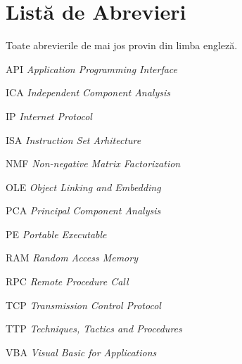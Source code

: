 \chapter*{Listă de Abrevieri}

\thispagestyle{front}

\noindent Toate abrevierile de mai jos provin din limba engleză.

\vspace{0.3cm}

\begin{abbreviations}
    \item[API] \textit{Application Programming Interface}
    \item[ICA] \textit{Independent Component Analysis}
    \item[IP] \textit{Internet Protocol}
    \item[ISA] \textit{Instruction Set Arhitecture}
    \item[NMF] \textit{Non-negative Matrix Factorization}
    \item[OLE] \textit{Object Linking and Embedding}
    \item[PCA] \textit{Principal Component Analysis}
    \item[PE] \textit{Portable Executable}
    \item[RAM] \textit{Random Access Memory}
    \item[RPC] \textit{Remote Procedure Call}
    \item[TCP] \textit{Transmission Control Protocol}
    \item[TTP] \textit{Techniques, Tactics and Procedures}
    \item[VBA] \textit{Visual Basic for Applications}
\end{abbreviations}

\newpage \